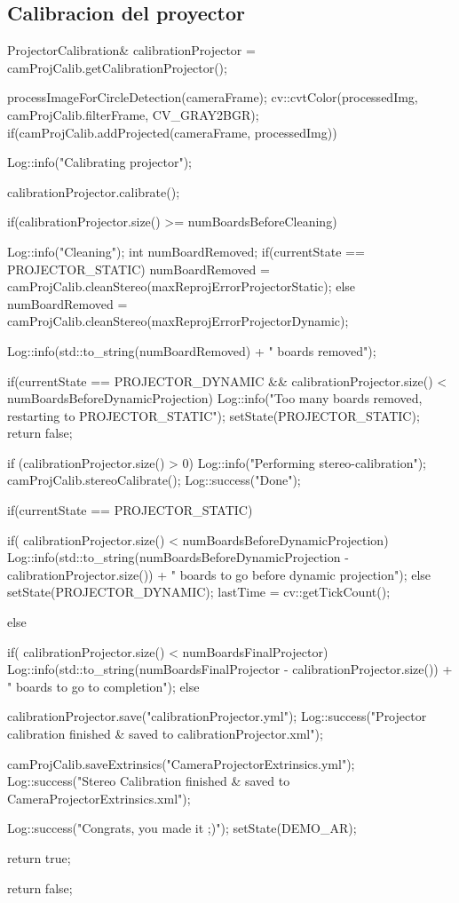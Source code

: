 \subsection{Calibracion del proyector}
\begin{listing}[
  float=ht,
  language = C++,
  caption  = {Atributos de la clase Project},
  label    = code:ProjectCalibration]
  ProjectorCalibration& calibrationProjector = camProjCalib.getCalibrationProjector();
  
  processImageForCircleDetection(cameraFrame);
  cv::cvtColor(processedImg, camProjCalib.filterFrame, CV_GRAY2BGR);
  if(camProjCalib.addProjected(cameraFrame, processedImg)){
    
    Log::info("Calibrating projector");
    
    calibrationProjector.calibrate();
    
    if(calibrationProjector.size() >= numBoardsBeforeCleaning) {
      Log::info("Cleaning");
      int numBoardRemoved;
      if(currentState == PROJECTOR_STATIC)
      numBoardRemoved = camProjCalib.cleanStereo(maxReprojErrorProjectorStatic);
      else	
      numBoardRemoved = camProjCalib.cleanStereo(maxReprojErrorProjectorDynamic);
      
      Log::info(std::to_string(numBoardRemoved) + " boards removed");
      
      if(currentState == PROJECTOR_DYNAMIC && calibrationProjector.size() < numBoardsBeforeDynamicProjection) {
        Log::info("Too many boards removed, restarting to PROJECTOR_STATIC");
        setState(PROJECTOR_STATIC);
        return false;
      }
    }
    
    if (calibrationProjector.size() > 0){
      Log::info("Performing stereo-calibration");
      camProjCalib.stereoCalibrate();
      Log::success("Done");
    }
    
    if(currentState == PROJECTOR_STATIC) {
      
      if( calibrationProjector.size() < numBoardsBeforeDynamicProjection) 
      Log::info(std::to_string(numBoardsBeforeDynamicProjection - calibrationProjector.size()) + " boards to go before dynamic projection");
      else {
        setState(PROJECTOR_DYNAMIC);
        lastTime = cv::getTickCount();
      }
    }
    else{
      if( calibrationProjector.size() < numBoardsFinalProjector) 
      Log::info(std::to_string(numBoardsFinalProjector - calibrationProjector.size()) + " boards to go to completion");
      else {
        calibrationProjector.save("calibrationProjector.yml");
        Log::success("Projector calibration finished & saved to calibrationProjector.xml");
        
        camProjCalib.saveExtrinsics("CameraProjectorExtrinsics.yml");
        Log::success("Stereo Calibration finished & saved to CameraProjectorExtrinsics.xml");
        
        Log::success("Congrats, you made it ;)");
        setState(DEMO_AR);
      }
    }
    return true;
  } 
  return false;
\end{listing}


